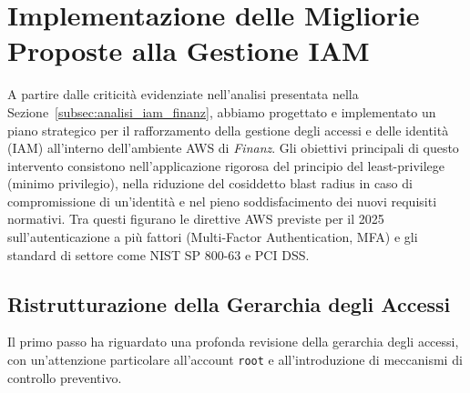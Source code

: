 \section{Implementazione delle Migliorie Proposte alla Gestione IAM}
\label{sec:implementazione_migliorie_iam}

A partire dalle criticità evidenziate nell'analisi presentata nella Sezione~\ref{subsec:analisi_iam_finanz}, abbiamo progettato e implementato un piano strategico per il rafforzamento della gestione degli accessi e delle identità (IAM) all'interno dell'ambiente AWS di \emph{Finanz}. Gli obiettivi principali di questo intervento consistono nell'applicazione rigorosa del principio del least-privilege (minimo privilegio), nella riduzione del cosiddetto blast radius in caso di compromissione di un'identità e nel pieno soddisfacimento dei nuovi requisiti normativi. Tra questi figurano le direttive AWS previste per il 2025 sull'autenticazione a più fattori (Multi-Factor Authentication, MFA) e gli standard di settore come NIST SP 800-63 e PCI DSS.

\subsection{Ristrutturazione della Gerarchia degli Accessi}
Il primo passo ha riguardato una profonda revisione della gerarchia degli accessi, con un'attenzione particolare all'account \texttt{root} e all'introduzione di meccanismi di controllo preventivo.

